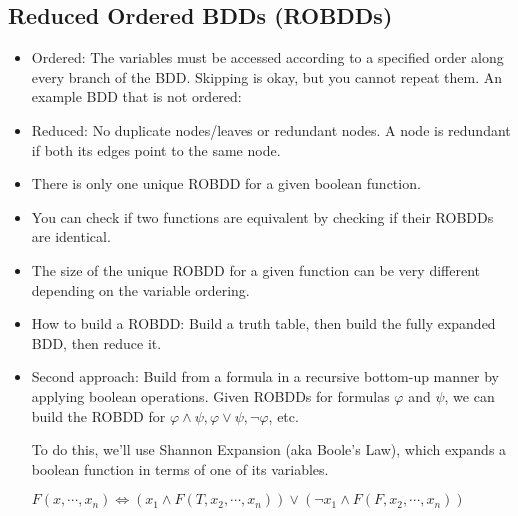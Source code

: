 \documentclass{article}
\begin{document}
\subsection*{Reduced Ordered BDDs (ROBDDs)}
\begin{itemize}
    \item Ordered: The variables must be accessed according to a specified order along every branch of the BDD. Skipping is okay, but you cannot repeat them. An example BDD that is not ordered:
    \begin{center}
\end{center}
    \item Reduced: No duplicate nodes/leaves or redundant nodes. A node is redundant if both its edges point to the same node.
    \item There is only one unique ROBDD for a given boolean function.
    \item You can check if two functions are equivalent by checking if their ROBDDs are identical.
    \item The size of the unique ROBDD for a given function can be very different depending on the variable ordering.
    \item How to build a ROBDD: Build a truth table, then build the fully expanded BDD, then reduce it.
    \item Second approach: Build from a formula in a recursive bottom-up manner by applying boolean operations. Given ROBDDs for formulas $\varphi$ and $\psi$, we can build the ROBDD for $\varphi \land \psi, \varphi \lor \psi, \neg \varphi$, etc.
    
    To do this, we'll use Shannon Expansion (aka Boole's Law), which expands a boolean function in terms of one of its variables. 

    $F(x,\cdots, x_n) \iff (x_1\land F(T, x_2, \cdots, x_n)) \lor (\neg x_1 \land F(F, x_2, \cdots, x_n))$


\end{itemize}
\end{document}
